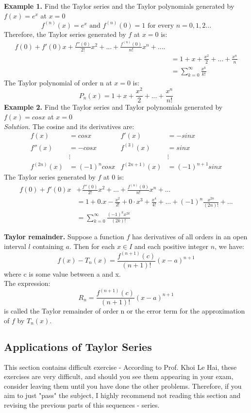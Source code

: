 \documentclass{article}
\begin{document}
\newpage
\textbf{Example 1.} Find the Taylor series and the Taylor polynomials generated by $f(x) = e^x $ at $ x = 0$ 
$$ f^{(n)}(x) = e^x \text{ and } f^{(n)}(0) = 1 \text{ for every } n = 0, 1, 2...$$
Therefore, the Taylor series generated by $f$ at $x=0$ is:
\begin{align*}
    f(0) + f'(0)x + \frac{f''(0)}{2!}x^2 + ... + \frac{f^{(n)}(0)}{n!}x^n + .... \\
    &= 1 + x + \frac{x^2 }{2} + ... + \frac{x^n}{n} \\
    &= \sum_{k=0}^{\infty} \frac{x^k}{k!}
\end{align*}
The Taylor polynomial of order n at $x=0$ is:
$$ P_n(x) = 1 + x + \frac{x^2}{2} + ... + \frac{x^n}{n!}$$
\newline
\textbf{Example 2. } Find the Taylor series and Taylor polynomials generated by $f(x) = cos x $ at $ x= 0$ \\ 
\textit{Solution. } The cosine and its derivatives are: 
\begin{align*}
    f(x) &= cos x & f'(x) &= -sin x \\
    f''(x) &= -cos x & f^{(3)}(x) &= sin x \\
    & \vdots &  &\vdots \\
    f^{(2n)}(x) &= (-1)^n cosx & f^{(2n+1)}(x) &= (-1)^{n+1} sinx
\end{align*}
The Taylor series generated by $f$ at 0 is: 
\begin{align*}
    f(0) + f'(0)x &+ \frac{f''(0)}{2!}x^2 + ... + \frac{f^{(n)}(0)}{n!}x^n + ... \\
    &= 1 + 0.x  - \frac{x^2}{2!} + 0\cdot x^3 + \frac{x^4}{4!} + ... + (-1)^n \frac{x^{2n}}{(2n)!} +... \\
    &= \sum_{k=0}^{\infty} \frac{(-1)^kx^{2k}}{(2k)!}
\end{align*}

\textbf{Taylor remainder.} Suppose a function $f$ has derivatives of all orders in an open interval $l$ containing $a$. Then for each $x \in I $ and each positive integer $n$, we have: 
$$ f(x) - T_n(x) = \frac{f^{(n+1)}(c)}{(n+1)!}(x-a)^{n+1}$$
where c is some value between a and x. \\
The expression: 
$$ R_n = \frac{f^{(n+1)}(c)}{(n+1)!}(x-a)^{n+1}$$ is called the Taylor remainder of order n or the error term for the approximation of $f $ by $T_n(x).$

\subsection{Applications of Taylor Series}
This section contains difficult exercise - According to Prof. Khoi Le Hai, these exercises are very difficult, and should you see them appearing in your exam, consider leaving them until you have done the other problems. Therefore, if you aim to just "pass" the subject, I highly recommend not reading this section and revising the previous parts of this sequences - series. 
\end{document}

